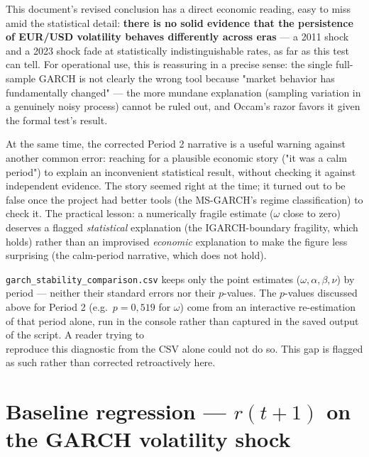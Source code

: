 \documentclass[12pt,a4paper]{article}
\begin{document}
\begin{econbox}
	This document's revised conclusion has a direct economic
	reading, easy to miss amid the statistical detail: \textbf{there
		is no solid evidence that the persistence of EUR/USD volatility
		behaves differently across eras} --- a 2011 shock and a 2023
	shock fade at statistically indistinguishable rates, as far as
	this test can tell. For operational use, this is reassuring in a
	precise sense: the single full-sample GARCH is not clearly the
	wrong tool because "market behavior has fundamentally
	changed" --- the more mundane explanation (sampling
	variation in a genuinely noisy process) cannot be ruled out, and
	Occam's razor favors it given the formal test's result.
	
	At the same time, the corrected Period 2 narrative is a useful
	warning against another common error: reaching for a
	plausible economic story ("it was a calm period") to
	explain an inconvenient statistical result, without checking it against
	independent evidence. The story seemed right at the time; it
	turned out to be false once the project had better tools (the
	MS-GARCH's regime classification) to check it. The
	practical lesson: a numerically fragile estimate ($\omega$ close to
	zero) deserves a flagged \emph{statistical} explanation (the
	IGARCH-boundary fragility, which holds) rather than an improvised
	\emph{economic} explanation to make the figure less surprising
	(the calm-period narrative, which does not hold).
\end{econbox}

\vspace{0.5cm}
\begin{limitbox}
	\texttt{garch\_stability\_comparison.csv} keeps only the
	point estimates ($\omega, \alpha, \beta, \nu$) by period
	--- neither their standard errors nor their $p$-values. The $p$-values
	discussed above for Period 2 (e.g.\ $p=0{,}519$ for $\omega$)
	come from an interactive re-estimation of that period alone,
	run in the console rather than captured in the saved output of the
	script. A reader trying to \\reproduce this diagnostic from the
	CSV alone could not do so. This gap is flagged as such rather
	than corrected retroactively here.
\end{limitbox}

\newpage

\section{Baseline regression --- $r(t+1)$ on the GARCH volatility shock}
\label{sec:baseline}
\end{document}
